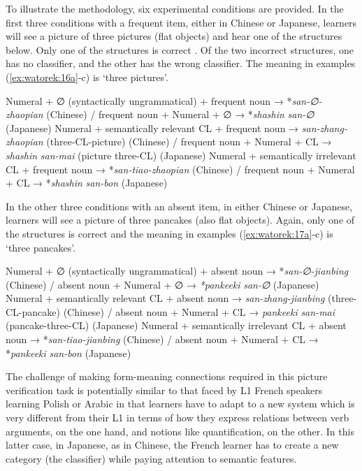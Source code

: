 \documentclass[output=paper,colorlinks,citecolor=brown,modfonts,nonflat]{../langscibook}
\begin{document}
To illustrate the methodology, six experimental conditions are provided. In the first three conditions with a frequent item, either in Chinese or Japanese, learners will see a picture of three pictures (flat objects) and hear one of the structures below. Only one of the structures is correct . Of the two incorrect structures, one has no classifier, and the other has the wrong classifier. The meaning in examples (\ref{ex:watorek:16a}-c) is ‘three pictures’.

\ea%
    \label{ex:watorek:16}
    \ea%
    \label{ex:watorek:16a}
    Numeral + ∅ (syntactically ungrammatical) + frequent noun → *\textit{san-∅-zhaopian} (Chinese) /  frequent noun + Numeral + ∅  → *\textit{shashin} \textit{san-∅} (Japanese)
    \ex%
    \label{ex:watorek:16b}
    Numeral + semantically relevant CL + frequent noun → \textit{san-zhang-zhaopian} (three-CL-picture) (Chinese) / frequent noun + Numeral + CL → \textit{shashin} \textit{san-mai} (picture three-CL) (Japanese)
    \ex%
    \label{ex:watorek:16c}
    Numeral + semantically irrelevant CL + frequent noun → *\textit{san-tiao-zhaopian} (Chinese) / frequent noun + Numeral + CL → *\textit{shashin} \textit{san-bon} (Japanese)
    \z
\z

In the other three conditions with an absent item, in either Chinese or Japanese, learners will see a picture of three pancakes (also flat objects). Again, only one of the structures is correct  and the meaning in examples (\ref{ex:watorek:17a}-c) is ‘three pancakes’.

\ea%
    \label{ex:watorek:17}
    \ea%
    \label{ex:watorek:17a}
    Numeral + ∅ (syntactically ungrammatical) + absent noun → *\textit{san-∅-jianbing} (Chinese) / absent noun + Numeral + ∅ → \textit{*pankeeki} \textit{san-∅} (Japanese)
    \ex%
    \label{ex:watorek:17b}
    Numeral + semantically relevant CL + absent noun → \textit{san-zhang-jianbing} (three-CL-pancake) (Chinese) / absent noun + Numeral + CL → \textit{pankeeki} \textit{san-mai} (pancake-three-CL) (Japanese)
    \ex%
    \label{ex:watorek:17c}
    Numeral + semantically irrelevant CL + absent noun → *\textit{san-tiao-jianbing} (Chinese) / absent noun + Numeral + CL → *\textit{pankeeki} \textit{san-bon} (Japanese)
    \z
\z

The challenge of making form-meaning connections required in this picture verification task is potentially similar to that faced by L1 French speakers learning Polish or Arabic in that learners have to adapt to a new system which is very different from their L1 in terms of how they express relations between verb arguments, on the one hand, and notions like quantification, on the other. In this latter case, in Japanese, as in Chinese, the French learner has to create a new category (the classifier) while paying attention to semantic features. 
\end{document}
